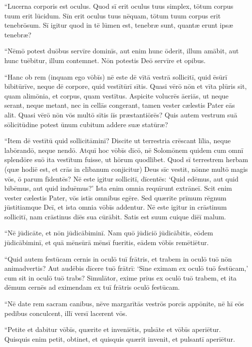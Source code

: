 \Versus ``Lucerna corporis est oculus. Quod sī erit oculus tuus simplex, tōtum corpus tuum erit lūcidum. 
\Versus Sīn erit oculus tuus nēquam, tōtum tuum corpus erit tenebrōsum. Sī igitur quod in tē lūmen est, tenebræ sunt, quantæ erunt ipsæ tenebræ?

\Versus ``Nēmō potest duōbus servīre dominīs, aut enim hunc ōderit, illum amābit, aut hunc tuēbitur, illum contemnet. Nōn potestis Deō servīre et opibus.

\Versus ``Hanc ob rem (inquam ego vōbīs) nē este dē vītā vestrā sollicitī, quid ēsūrī bibitūrīve, neque dē corpore, quid vestītūrī sītis. Quasi vērō nōn et vīta plūris sit, quam alimōnia, et corpus, quam vestītus. 
\Versus Aspicite volucrēs āeriās, ut neque serant, neque metant, nec in cellās congerant, tamen vester cælestis Pater eās alit. Quasi vērō nōn vōs multō sītis iīs præstantiōrēs? 
\Versus Quis autem vestrum suā sōlicitūdine potest ūnum cubitum addere suæ statūræ?

\Versus ``Item dē vestītū quid sollicitāminī? Discite ut terrestria crēscant līlia, neque labōran\-dō, neque nendō. 
\Versus Atquī hoc vōbīs dīcō, nē Solomōnem quidem cum omnī splendōre suō ita vestītum fuisse, ut hōrum quodlibet. 
\Versus Quod sī terrestrem herbam (quæ hodiē est, et crās in clībanum conjicitur) Deus sīc vestit, nōnne multō magis vōs, ō parum fīdentēs? 
\Versus Nē este igitur sollicitī, dīcentēs: `Quid edēmus, aut quid bibēmus, aut quid induēmus?' 
\Versus Ista enim omnia requīrunt extrāneī. Scit enim vester cælestis Pater, vōs istīs omnibus egēre. 
\Versus Sed quærite prīmum rēgnum jūstitiamque Deī, et ista omnia vōbīs addentur. 
\Versus Nē este igitur in crāstinum sollicitī, nam crāstinus diēs sua cūrābit. Satis est suum cuique diēī malum.
 

\Caput
\Versus ``Nē jūdicāte, et nōn jūdicābiminī.
\Versus Nam quō jūdiciō jūdicābitis, eōdem jūdicābiminī, et quā mēnsūrā mēnsī fueritis, eādem vōbīs remētiētur. 

\Versus ``Quid autem festūcam cernis in oculō tuī frātris, et trabem in oculō tuō nōn animadvertis? 
\Versus Aut audēbis dīcere tuō frātrī: `Sine eximam ex oculō tuō festūcam,' cum sit in oculō tuō trabs? 
\Versus Simulātor, exime prius ex oculō tuō trabem, et ita dēmum cernēs ad eximendam ex tuī frātris oculō festūcam.

\Versus ``Nē date rem sacram canibus, nēve margarītās vestrōs porcīs appōnite, nē hī eōs pedibus conculcent, illī versī lacerent vōs.

\Versus ``Petite et dabitur vōbīs, quærite et inveniētis, pulsāte et vōbīs aperiētur. 
\Versus Quisquis enim petit, obtinet, et quisquis quærit invenit, et pulsantī aperiētur. 

